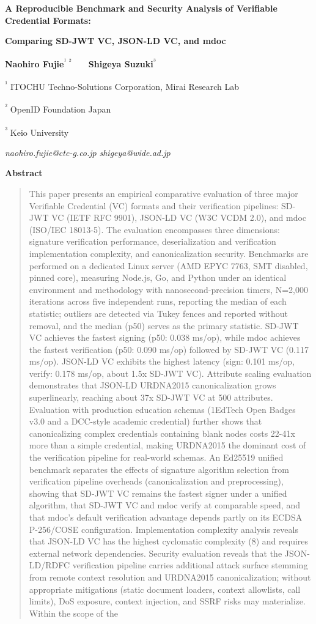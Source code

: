 \textbf{A Reproducible Benchmark and Security Analysis of Verifiable Credential Formats:}

\textbf{Comparing SD-JWT VC, JSON-LD VC, and mdoc}

\textbf{Naohiro Fujie}\textsuperscript{¹ ²}　　\textbf{Shigeya Suzuki}\textsuperscript{³}

\textsuperscript{¹} ITOCHU Techno-Solutions Corporation, Mirai Research Lab

\textsuperscript{²} OpenID Foundation Japan

\textsuperscript{³} Keio University

\emph{naohiro.fujie@ctc-g.co.jp} \emph{shigeya@wide.ad.jp}

\textbf{Abstract}

\begin{quote}
This paper presents an empirical comparative evaluation of three major Verifiable Credential (VC) formats and their verification pipelines: SD-JWT VC (IETF RFC 9901), JSON-LD VC (W3C VCDM 2.0), and mdoc (ISO/IEC 18013-5). The evaluation encompasses three dimensions: signature verification performance, deserialization and verification implementation complexity, and canonicalization security. Benchmarks are performed on a dedicated Linux server (AMD EPYC 7763, SMT disabled, pinned core), measuring Node.js, Go, and Python under an identical environment and methodology with nanosecond-precision timers, N=2,000 iterations across five independent runs, reporting the median of each statistic; outliers are detected via Tukey fences and reported without removal, and the median (p50) serves as the primary statistic. SD-JWT VC achieves the fastest signing (p50: 0.038 ms/op), while mdoc achieves the fastest verification (p50: 0.090 ms/op) followed by SD-JWT VC (0.117 ms/op). JSON-LD VC exhibits the highest latency (sign: 0.101 ms/op, verify: 0.178 ms/op, about 1.5x SD-JWT VC). Attribute scaling evaluation demonstrates that JSON-LD URDNA2015 canonicalization grows superlinearly, reaching about 37x SD-JWT VC at 500 attributes. Evaluation with production education schemas (1EdTech Open Badges v3.0 and a DCC-style academic credential) further shows that canonicalizing complex credentials containing blank nodes costs 22-41x more than a simple credential, making URDNA2015 the dominant cost of the verification pipeline for real-world schemas. An Ed25519 unified benchmark separates the effects of signature algorithm selection from verification pipeline overheads (canonicalization and preprocessing), showing that SD-JWT VC remains the fastest signer under a unified algorithm, that SD-JWT VC and mdoc verify at comparable speed, and that mdoc's default verification advantage depends partly on its ECDSA P-256/COSE configuration. Implementation complexity analysis reveals that JSON-LD VC has the highest cyclomatic complexity (8) and requires external network dependencies. Security evaluation reveals that the JSON-LD/RDFC verification pipeline carries additional attack surface stemming from remote context resolution and URDNA2015 canonicalization; without appropriate mitigations (static document loaders, context allowlists, call limits), DoS exposure, context injection, and SSRF risks may materialize. Within the scope of the 
\end{quote}
